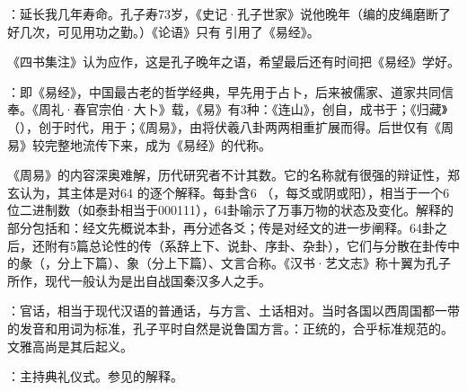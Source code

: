 {
\item {}：延长我几年寿命。孔子寿73岁，《史记·孔子世家》说他晚年（编的皮绳磨断了好几次，可见用功之勤。）《论语》只有  引用了《易经》。

《四书集注》认为应作，这是孔子晚年之语，希望最后还有时间把《易经》学好。

\item {}：即《易经》，中国最古老的哲学经典，早先用于占卜，后来被儒家、道家共同信奉。《周礼·春官宗伯·大卜》载，《易》有3种：《连山》，创自，成书于；《归藏》（），创于时代，用于；《周易》，由将伏羲八卦两两相重扩展而得。后世仅有《周易》较完整地流传下来，成为《易经》的代称。

《周易》的内容深奥难解，历代研究者不计其数。它的名称就有很强的辩证性，郑玄认为，其主体是对64 的逐个解释。每卦含6 （，每爻或阴或阳），相当于一个6位二进制数（如泰卦相当于000111），64卦喻示了万事万物的状态及变化。解释的部分包括和：经文先概说本卦，再分述各爻；传是对经文的进一步阐释。64卦之后，还附有5篇总论性的传（系辞上下、说卦、序卦、杂卦），它们与分散在卦传中的彖（，分上下篇）、象（分上下篇）、文言合称。《汉书·艺文志》称十翼为孔子所作，现代一般认为是出自战国秦汉多人之手。
}
{}


{
\item {}：官话，相当于现代汉语的普通话，与方言、土话相对。当时各国以西周国都一带的发音和用词为标准，孔子平时自然是说鲁国方言。：正统的，合乎标准规范的。文雅高尚是其后起义。
\item {}：主持典礼仪式。参见的解释。
}
{}


